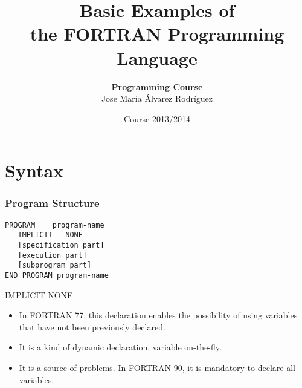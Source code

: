 \documentclass[xcolor=dvipsnames,dvip,notes=show,table]{beamer}
\title[FORTRAN]{Basic Examples of \\ the FORTRAN Programming Language}
\author[Jose María Álvarez Rodríguez]{\textbf{Programming Course} \\ \vspace{0.3cm} Jose María Álvarez Rodríguez}
\subtitle{}
\institute{Department of Computer Science \\ Carlos III University of Madrid}
\date{Course 2013/2014}
\begin{document}
\frame{
\titlepage

}
% 
\frame{
\tableofcontents

}
% 
% 
\section{Syntax}
% 


% 
\begin{frame}[fragile]
\frametitle{Program Structure}

\begin{lstlisting}
PROGRAM    program-name
   IMPLICIT   NONE 
   [specification part]
   [execution part]
   [subprogram part]
END PROGRAM program-name
\end{lstlisting}

\begin{alertblock}{IMPLICIT NONE}
\begin{itemize}
 \item In FORTRAN 77, this declaration enables the possibility of using variables that have not been previously declared.
 \item  It is a kind of dynamic declaration, variable on-the-fly.
 \item It is a source of problems. In FORTRAN 90, it is mandatory to declare all variables.
\end{itemize}
\end{alertblock}

\end{frame}
\end{document}
